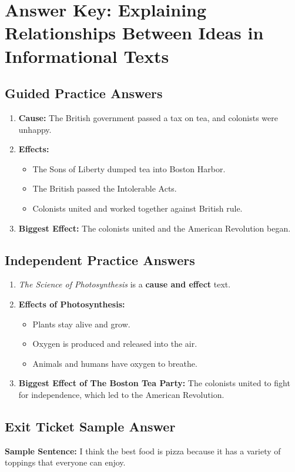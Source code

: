 \documentclass[12pt]{article}
\begin{document}
\section*{Answer Key: Explaining Relationships Between Ideas in Informational Texts}

\subsection*{Guided Practice Answers}
\begin{enumerate}
    \item \textbf{Cause:} The British government passed a tax on tea, and colonists were unhappy.
    \item \textbf{Effects:} 
    \begin{itemize}
        \item The Sons of Liberty dumped tea into Boston Harbor.
        \item The British passed the Intolerable Acts.
        \item Colonists united and worked together against British rule.
    \end{itemize}
    \item \textbf{Biggest Effect:} The colonists united and the American Revolution began.
\end{enumerate}

\subsection*{Independent Practice Answers}
\begin{enumerate}
    \item \textit{The Science of Photosynthesis} is a \textbf{cause and effect} text.
    \item \textbf{Effects of Photosynthesis:} 
    \begin{itemize}
        \item Plants stay alive and grow.
        \item Oxygen is produced and released into the air.
        \item Animals and humans have oxygen to breathe.
    \end{itemize}
    \item \textbf{Biggest Effect of The Boston Tea Party:} The colonists united to fight for independence, which led to the American Revolution.
\end{enumerate}

\subsection*{Exit Ticket Sample Answer}
\textbf{Sample Sentence:} I think the best food is pizza because it has a variety of toppings that everyone can enjoy.
\end{document}
